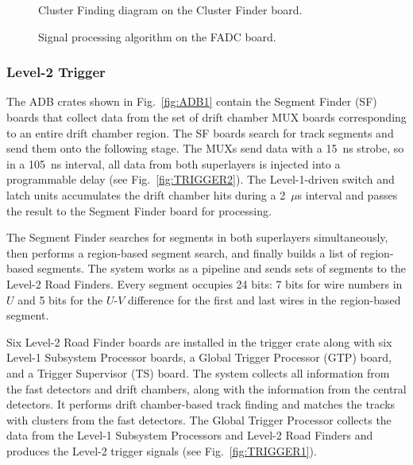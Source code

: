 \begin{figure}[ht]
\vspace{10.0cm}
\caption{\small{Cluster Finding diagram on the Cluster Finder board.}}
\label{fig:TRIGGER_CF} 
\end{figure}

\begin{figure}[ht]
\vspace{10.0cm}
\caption{\small{Signal processing algorithm on the FADC board.}}
\label{fig:TRIGGER_FADC_1} 
\end{figure}

\subsubsection{Level-2 Trigger}

The ADB crates shown in Fig.~\ref{fig:ADB1} contain the Segment Finder 
(SF) boards that collect data from the set of drift chamber MUX boards
corresponding to an entire drift chamber region. The SF boards search for
track segments and send them onto the following stage.  The MUXs send data 
with a 15~ns strobe, so in a 105~ns interval, all data from both superlayers
is injected into a programmable delay (see Fig.~\ref{fig:TRIGGER2}).  The 
Level-1-driven switch and latch units accumulates the drift chamber hits 
during a 2~$\mu$s interval and passes the result to the Segment Finder board 
for processing.

The Segment Finder searches for segments in both superlayers simultaneously, 
then performs a region-based segment search, and finally builds a list of 
region-based segments.  The system works as a pipeline and sends sets of 
segments to the Level-2 Road Finders. Every segment occupies 24 bits: 7 bits for 
wire numbers in $U$ and 5 bits for the $U$-$V$ difference for the first and 
last wires in the region-based segment.

Six Level-2 Road Finder boards are installed in the trigger crate along with 
six Level-1 Subsystem Processor boards, a Global Trigger Processor (GTP) board, 
and a Trigger Supervisor (TS) board. The system collects all information from 
the fast detectors and drift chambers, along with the information from the 
central detectors.  It performs drift chamber-based track finding and matches 
the tracks with clusters from the fast detectors.  The Global Trigger Processor 
collects the data from the Level-1 Subsystem Processors and Level-2 Road Finders 
and produces the Level-2 trigger signals (see Fig.~\ref{fig:TRIGGER1}).

